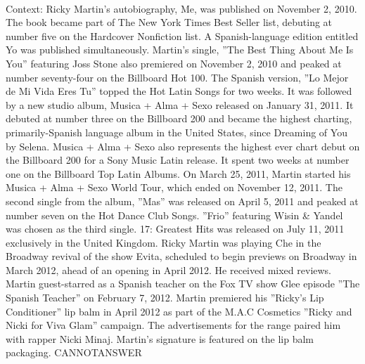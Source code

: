 \documentclass[11pt,a4paper, onecolumn]{article}
\begin{document}
\\ Context: Ricky Martin's autobiography, Me, was published on November 2, 2010. The book became part of The New York Times Best Seller list, debuting at number five on the Hardcover Nonfiction list. A Spanish-language edition entitled Yo was published simultaneously. Martin's single, ''The Best Thing About Me Is You'' featuring Joss Stone also premiered on November 2, 2010 and peaked at number seventy-four on the Billboard Hot 100. The Spanish version, ''Lo Mejor de Mi Vida Eres Tu'' topped the Hot Latin Songs for two weeks. It was followed by a new studio album, Musica + Alma + Sexo released on January 31, 2011. It debuted at number three on the Billboard 200 and became the highest charting, primarily-Spanish language album in the United States, since Dreaming of You by Selena. Musica + Alma + Sexo also represents the highest ever chart debut on the Billboard 200 for a Sony Music Latin release. It spent two weeks at number one on the Billboard Top Latin Albums. On March 25, 2011, Martin started his Musica + Alma + Sexo World Tour, which ended on November 12, 2011. The second single from the album, ''Mas'' was released on April 5, 2011 and peaked at number seven on the Hot Dance Club Songs. ''Frio'' featuring Wisin & Yandel was chosen as the third single. 17: Greatest Hits was released on July 11, 2011 exclusively in the United Kingdom. Ricky Martin was playing Che in the Broadway revival of the show Evita, scheduled to begin previews on Broadway in March 2012, ahead of an opening in April 2012. He received mixed reviews. Martin guest-starred as a Spanish teacher on the Fox TV show Glee episode ''The Spanish Teacher'' on February 7, 2012. Martin premiered his ''Ricky's Lip Conditioner'' lip balm in April 2012 as part of the M.A.C Cosmetics ''Ricky and Nicki for Viva Glam'' campaign. The advertisements for the range paired him with rapper Nicki Minaj. Martin's signature is featured on the lip balm packaging. CANNOTANSWER
\end{document}
